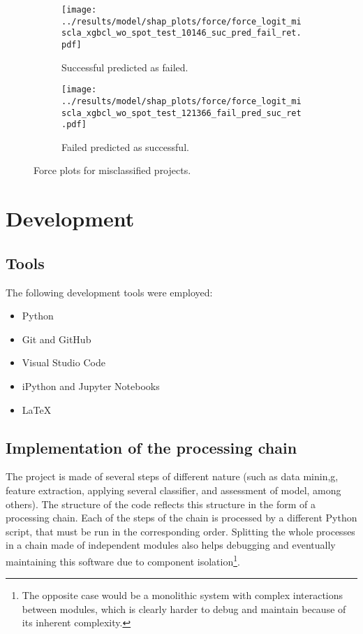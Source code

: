 \documentclass{article}
\begin{document}
\begin{itemize}
\begin{figure}
  \begin{subfigure}{1\linewidth}
    \centering\texttt{[image: ../results/model/shap\_plots/force/force\_logit\_miscla\_xgbcl\_wo\_spot\_test\_10146\_suc\_pred\_fail\_ret.pdf]}
    \caption{Successful predicted as failed.}
\label{fig:shapforce1}
  \end{subfigure}
  \begin{subfigure}{1\linewidth}
    \centering\texttt{[image: ../results/model/shap\_plots/force/force\_logit\_miscla\_xgbcl\_wo\_spot\_test\_121366\_fail\_pred\_suc\_ret.pdf]}
    \caption{Failed predicted as successful.}
\label{fig:shapforce2}
  \end{subfigure}
\caption{Force plots for misclassified projects.}
\label{fig:shapforce}
\end{figure}

\end{itemize}

\section{Development}
\label{sec:dev}

\subsection{Tools}
\label{sec:devTools}

The following development tools were employed:
\begin{itemize}
\item Python
\item Git and GitHub
\item Visual Studio Code
\item iPython and Jupyter Notebooks
\item LaTeX
\end{itemize}

\subsection{Implementation of the processing chain}
\label{sec:chain}
The project is made of several steps of different nature (such as data minin,g, feature extraction, applying several classifier, and assessment of model, among others). The structure of the code reflects this structure in the form of a processing chain. Each of the steps of the chain is processed by a different Python script, that must be run in the corresponding order. Splitting the whole processes in a chain made of independent modules also helps debugging and eventually maintaining this software due to component isolation\footnote{The opposite case would be a monolithic system with complex interactions between modules, which is clearly harder to debug and maintain because of its inherent complexity.}.
\end{document}
